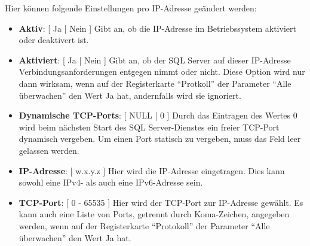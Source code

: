           Hier können folgende Einstellungen pro IP-Adresse geändert werden:
          \begin{itemize}
              \item \textbf{Aktiv}: [ Ja | Nein ] Gibt an, ob die IP-Adresse im
              Betriebssystem aktiviert oder deaktivert ist.
              \item \textbf{Aktiviert}: [ Ja | Nein ] Gibt an, ob der SQL Server
              auf dieser IP-Adresse Verbindungsanforderungen entgegen nimmt oder
              nicht. Diese Option wird nur dann wirksam, wenn auf der
              Registerkarte \enquote{Protkoll} der Parameter \enquote{Alle
              überwachen} den Wert Ja hat, andernfalls wird sie ignoriert.
              \item \textbf{Dynamische TCP-Ports}: [ NULL | 0 ] Durch das
              Eintragen des Wertes 0 wird beim nächsten Start des SQL
              Server-Dienstes ein freier TCP-Port dynamisch vergeben. Um einen
              Port statisch zu vergeben, muss das Feld leer gelassen werden.
              \item \textbf{IP-Adresse}: [ w.x.y.z ] Hier wird die IP-Adresse
              eingetragen. Dies kann sowohl eine IPv4- als auch eine IPv6-Adresse
              sein.
              \item \textbf{TCP-Port}: [ 0 - 65535 ] Hier wird der TCP-Port zur
              IP-Adresse gewählt. Es kann auch eine Liste von Ports,
              getrennt durch Koma-Zeichen, angegeben werden, wenn auf der
              Registerkarte \enquote{Protokoll} der Parameter \enquote{Alle
              überwachen} den Wert Ja hat.
          \end{itemize}
